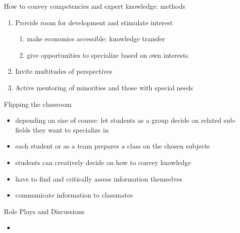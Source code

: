 \begin{frame}{How to convey competencies and expert knowledge: methods}
	
	\begin{enumerate}
		\item<+-> Provide room for development and stimulate interest
		\begin{enumerate}
	\item<+-> {make economics accessible: knowledge transfer} %
	\item<+-> {give opportunities to specialize based on own interests}
\end{enumerate}
		\item<+-> Invite multitudes of perspectives
		\item<+-> Active mentoring of minorities and those with special needs
	\end{enumerate}
\end{frame}

\begin{frame}{Flipping the classroom}
\begin{itemize}
	\item depending on size of course: let students as a \alert{group} decide on related sub-fields they want to specialize in 
	\item each student or as a team prepares a class on the chosen subjects
	\item students can \alert{creatively} decide on how to convey knowledge
	\item have to find and \alert{critically} assess information themselves
	\item \alert{communicate} information to classmates
\end{itemize}
\end{frame}


\begin{frame}{Role Plays and Discussions}
	\begin{itemize}
		\item 
	\end{itemize}
\end{frame}


